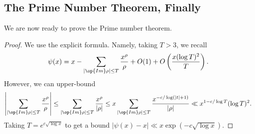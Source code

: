 \documentclass[../notes.tex]{subfiles}
\begin{document}
\subsection{The Prime Number Theorem, Finally}
We are now ready to prove the Prime number theorem.
\pntthm*
\begin{proof}
	We use the explicit formula. Namely, taking $T>3$, we recall
	\[\psi(x)=x-\sum_{|\op{Im}\rho|\le T}\frac{x^\rho}\rho+O(1)+O\left(\frac{x(\log T)^2}T\right).\]
	However, we can upper-bound
	\[\left|\sum_{|\op{Im}\rho|\le T}\frac{x^\rho}\rho\right|\le\sum_{|\op{Im}\rho|\le T}\frac{x^\rho}{|\rho|}\le x\sum_{|\op{Im}\rho|\le T}\frac{x^{-c/\log(|t|+1)}}{|\rho|}\ll x^{1-c/\log T}(\log T)^2.\]
	Taking $T=e^{c\sqrt{\log x}}$ to get a bound $|\psi(x)-x|\ll x\exp(-c\sqrt{\log x})$.
\end{proof}
\end{document}
